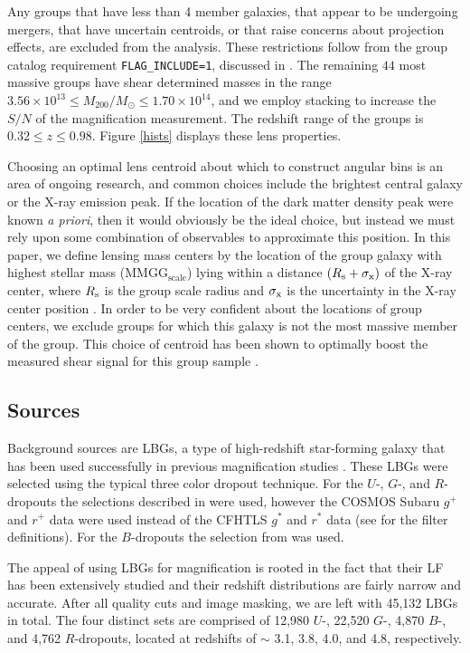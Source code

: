 Any groups that have less than 4 member galaxies, that appear to be undergoing mergers, that have uncertain centroids, or that raise concerns about projection effects, are excluded from the analysis. These restrictions follow from the group catalog requirement \texttt{FLAG\_INCLUDE=1}, discussed in \citet{George11}. The remaining $44$ most massive groups have shear determined masses in the range $ 3.56 \times 10^{13} \le M_{200} / M_\odot \le 1.70 \times 10^{14} $, and we employ stacking to increase the $S/N$ of the magnification measurement.  The redshift range of the groups is $ 0.32 \le z \le 0.98 $. Figure \ref{hists} displays these lens properties.

Choosing an optimal lens centroid about which to construct angular bins is an area of ongoing research, and common choices include the brightest central galaxy or the X-ray emission peak.  If the location of the dark matter density peak were known {\it a priori}, then it would obviously be the ideal choice, but instead we must rely upon some combination of observables to approximate this position.  In this paper, we define lensing mass centers by the location of the group galaxy with highest stellar mass (MMGG$_\mathrm{scale}$) lying within a distance $ (R_{\rm s} + \sigma_{\rm x}) $ of the X-ray center, where $ R_{\rm s} $ is the group scale radius and $ \sigma_{\rm x} $ is the uncertainty in the X-ray center position \citep{George11}.  In order to be very confident about the locations of group centers, we exclude groups for which this galaxy is not the most massive member of the group.  This choice of centroid has been shown to optimally boost the measured shear signal for this group sample \citep{George12}.  

\subsection{Sources}
Background sources are \ac{LBG}s, a type of high-redshift star-forming galaxy that has been used successfully in previous magnification studies \citep[see][]{Hildebrandt09b, Hildebrandt11}. These \ac{LBG}s were selected using the typical three color dropout technique. For the $U$-, $G$-, and $R$-dropouts the selections described in \citet{Hildebrandt09a} were used, however the \ac{COSMOS} Subaru $g^+$ and $r^+$ data were used instead of the \acf{CFHTLS} $g^*$ and $r^*$ data (see \citet{Capak07} for the filter definitions). For the $B$-dropouts the selection from \citet{Ouchi04} was used.  

The appeal of using \ac{LBG}s for magnification is rooted in the fact that their \acf{LF} has been extensively studied and their redshift distributions are fairly narrow and accurate.  After all quality cuts and image masking, we are left with 45,132 \ac{LBG}s in total.  The four distinct sets are comprised of 12,980 $U$-, 22,520 $G$-, 4,870 $B$-, and 4,762 $R$-dropouts, located at redshifts of $\sim$ 3.1, 3.8, 4.0, and 4.8, respectively.

